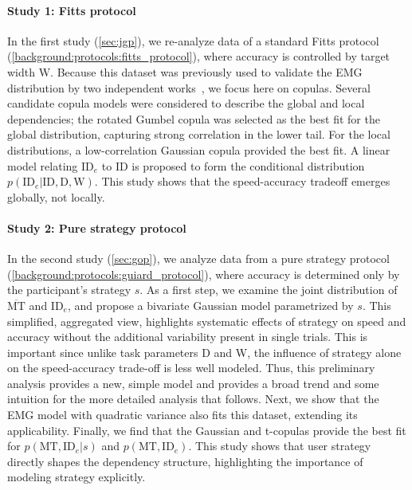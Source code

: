 \documentclass[acmlarge, manuscript,review]{acmart}
\newcommand{\mmt}{\ensuremath{\overline{\mt}}\xspace}
\newcommand{\mt}{\ensuremath{{\text{MT}}}\xspace}
\newcommand{\ide}{\ensuremath{{\text{ID}_e}}\xspace}
\newcommand{\D}{\ensuremath{{\text{D}}}\xspace}
\newcommand{\W}{\ensuremath{{\text{W}}}\xspace}
\begin{document}
\paragraph*{Study 1: Fitts protocol} 
In the first study (\autoref{sec:jgp}), we re-analyze data of a standard Fitts protocol (\autoref{background:protocols:fitts_protocol}), where accuracy is controlled by target width \W. 
Because this dataset was previously used to validate the EMG distribution by two independent works~\cite{gori2018these,zhao2022}, we focus here on copulas.
Several candidate copula models were considered to describe the global and local dependencies; the rotated Gumbel copula was selected as the best fit for the global distribution, capturing strong correlation in the lower tail. 
For the local distributions, a low-correlation Gaussian copula provided the best fit. 
A linear model relating \ide to ID is proposed to form the conditional distribution $p(\ide | \text{ID}, \D, \W)$. 
This study shows that the speed-accuracy tradeoff emerges globally, not locally.


\paragraph*{Study 2: Pure strategy protocol} 
In the second study (\autoref{sec:gop}), we analyze data from a pure strategy protocol (\autoref{background:protocols:guiard_protocol}), where accuracy is determined only by the participant's strategy $s$. 
As a first step, we examine the joint distribution of \mmt and \ide,  and propose a bivariate Gaussian model parametrized by $s$. 
This simplified, aggregated view, highlights systematic effects of strategy on speed and accuracy without the additional variability present in single trials. This is important since unlike task parameters D and W, the influence of strategy alone on the speed-accuracy trade-off is less well modeled.
Thus, this preliminary analysis provides a new, simple model and provides a broad trend and some intuition for the more detailed analysis that follows.
Next, we show that the EMG model with quadratic variance also fits this dataset, extending its applicability. 
Finally, we find that the Gaussian and t-copulas provide the best fit for $p(\mt, \ide | s)$ and $p(\mt, \ide)$.
This study shows that user strategy directly shapes the dependency structure, highlighting the importance of modeling strategy explicitly.
\end{document}
